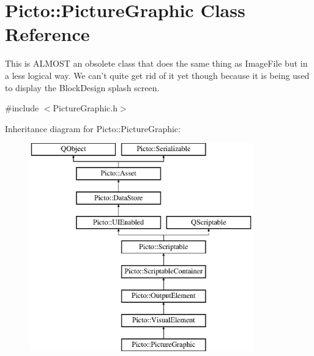 \hypertarget{class_picto_1_1_picture_graphic}{\section{Picto\-:\-:Picture\-Graphic Class Reference}
\label{class_picto_1_1_picture_graphic}
}


This is A\-L\-M\-O\-S\-T an obsolete class that does the same thing as Image\-File but in a less logical way. We can't quite get rid of it yet though because it is being used to display the Block\-Design splash screen.  




{\ttfamily \#include $<$Picture\-Graphic.\-h$>$}

Inheritance diagram for Picto\-:\-:Picture\-Graphic\-:\begin{figure}[H]
\begin{center}
\leavevmode
\includegraphics[height=9.000000cm]{class_picto_1_1_picture_graphic}
\end{center}
\end{figure}
